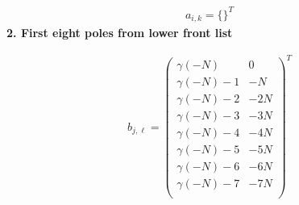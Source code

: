 \documentclass[11pt]{article}
\begin{document}
\begin{align*}
  a_{i,k} = 
  \{\}^T 
\end{align*}
\noindent\textbf{2. First eight poles from lower front list}

\begin{align*}
  b_{j,\ell} = 
  \left(
\begin{array}{cc}
 \gamma  (-N) & 0 \\
 \gamma  (-N)-1 & -N \\
 \gamma  (-N)-2 & -2 N \\
 \gamma  (-N)-3 & -3 N \\
 \gamma  (-N)-4 & -4 N \\
 \gamma  (-N)-5 & -5 N \\
 \gamma  (-N)-6 & -6 N \\
 \gamma  (-N)-7 & -7 N \\
\end{array}
\right)^T 
\end{align*}

\printbibliography[title={References}]
\end{document}
